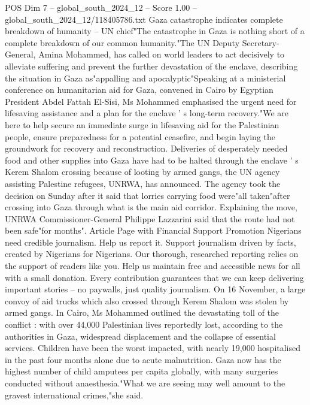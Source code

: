 \begin{textsample}{POS Dim 7 – global\_south\_2024\_12 – Score 1.00 – global\_south\_2024\_12/118405786.txt}  \label{ex:f7_pos_158}
Gaza catastrophe indicates complete breakdown of humanity -- UN chief"The catastrophe in Gaza is nothing short of a complete breakdown of our common humanity."The UN Deputy Secretary-General, Amina Mohammed, has called on world leaders to act decisively to alleviate suffering and prevent the further devastation of the enclave, describing the situation in Gaza as"appalling and apocalyptic"Speaking at a ministerial conference on humanitarian aid for Gaza, convened in Cairo by Egyptian President Abdel Fattah El-Sisi, Ms Mohammed emphasised the urgent need for lifesaving assistance and a plan for the enclave ' s long-term recovery."We are here to help secure an immediate surge in lifesaving aid for the Palestinian people, ensure preparedness for a potential ceasefire, and begin laying the groundwork for recovery and reconstruction.
Deliveries of desperately needed food and other supplies into Gaza have had to be halted through the enclave ' s Kerem Shalom crossing because of looting by armed gangs, the UN agency assisting Palestine refugees, UNRWA, has announced.
The agency took the decision on Sunday after it said that lorries carrying food were"all taken"after crossing into Gaza through what is the main aid corridor.
Explaining the move, UNRWA Commissioner-General Philippe Lazzarini said that the route had not been safe"for months".
Article Page with Financial Support Promotion Nigerians need credible journalism.
Help us report it.
Support journalism driven by facts, created by Nigerians for Nigerians.
Our thorough, researched reporting relies on the support of readers like you.
Help us maintain free and accessible news for all with a small donation.
Every contribution guarantees that we can keep delivering important stories -- no paywalls, just quality journalism.
On 16 November, a large convoy of aid trucks which also crossed through Kerem Shalom was stolen by armed gangs.
In Cairo, Ms Mohammed outlined the devastating toll of the conflict : with over 44,000 Palestinian lives reportedly lost, according to the authorities in Gaza, widespread displacement and the collapse of essential services.
Children have been the worst impacted, with nearly 19,000 hospitalised in the past four months alone due to acute malnutrition.
Gaza now has the highest number of child amputees per capita globally, with many surgeries conducted without anaesthesia."What we are seeing may well amount to the gravest international crimes,"she said.

\end{textsample}
